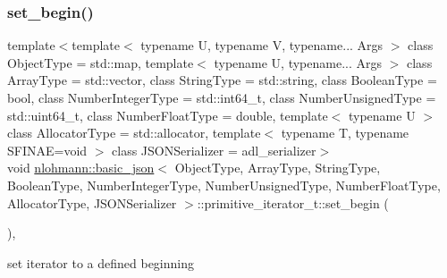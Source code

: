 \subsubsection{\texorpdfstring{set\+\_\+begin()}{set\_begin()}}
{\footnotesize\ttfamily template$<$template$<$ typename U, typename V, typename... Args $>$ class Object\+Type = std\+::map, template$<$ typename U, typename... Args $>$ class Array\+Type = std\+::vector, class String\+Type  = std\+::string, class Boolean\+Type  = bool, class Number\+Integer\+Type  = std\+::int64\+\_\+t, class Number\+Unsigned\+Type  = std\+::uint64\+\_\+t, class Number\+Float\+Type  = double, template$<$ typename U $>$ class Allocator\+Type = std\+::allocator, template$<$ typename T, typename S\+F\+I\+N\+A\+E=void $>$ class J\+S\+O\+N\+Serializer = adl\+\_\+serializer$>$ \\
void \hyperlink{classnlohmann_1_1basic__json}{nlohmann\+::basic\+\_\+json}$<$ Object\+Type, Array\+Type, String\+Type, Boolean\+Type, Number\+Integer\+Type, Number\+Unsigned\+Type, Number\+Float\+Type, Allocator\+Type, J\+S\+O\+N\+Serializer $>$\+::primitive\+\_\+iterator\+\_\+t\+::set\+\_\+begin (\begin{DoxyParamCaption}{ }\end{DoxyParamCaption})\hspace{0.3cm}{\ttfamily [inline]}, {\ttfamily [noexcept]}}



set iterator to a defined beginning 

\mbox{\label{classnlohmann_1_1basic__json_1_1primitive__iterator__t_a2f42b499859a1d76d206bcdf0ed8a194}} 
